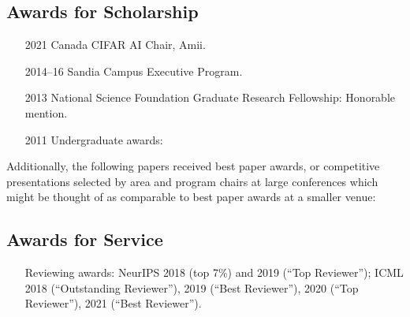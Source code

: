 \documentclass[10pt]{article}
\begin{document}
\subsection{Awards for Scholarship} %

\begin{itemize}[leftmargin=5em]
  \item[2021] {Canada CIFAR AI Chair, Amii. } %

  \item[2014--16] Sandia Campus Executive Program. 
  \item[2013] National Science Foundation Graduate Research Fellowship: Honorable mention.
  \item[2011] Undergraduate awards: 
\end{itemize}

Additionally, the following papers received best paper awards,
or competitive presentations selected by area and program chairs at large conferences
which might be thought of as comparable to best paper awards at a smaller venue:
\begin{itemize}[leftmargin=5em]
  
\end{itemize}

\subsection{Awards for Service} %
\begin{itemize}
  \item[] Reviewing awards: NeurIPS 2018 (top 7\%) and 2019 (``Top Reviewer''); ICML 2018 (``Outstanding Reviewer''), 2019 (``Best Reviewer''), 2020 (``Top Reviewer''), 2021 (``Best Reviewer'').
\end{itemize}
\end{document}
